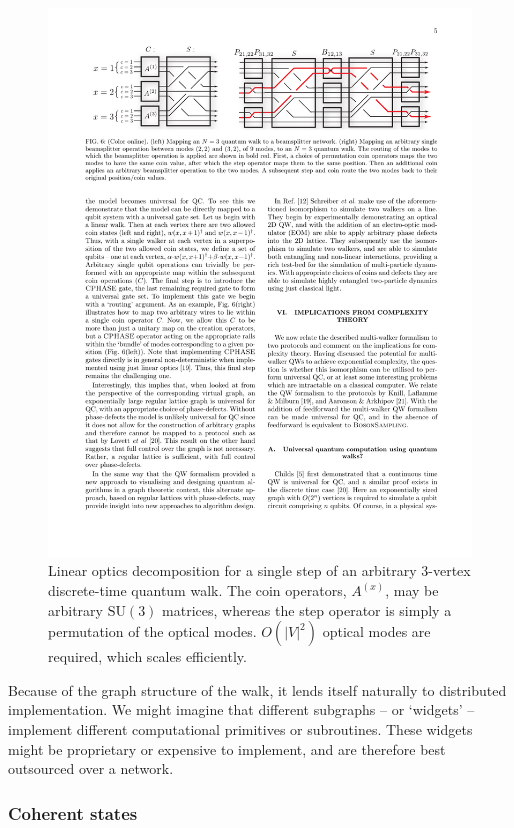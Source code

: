 \documentclass[aps,rmp,twocolumn,amsmath,amssymb,nofootinbib,superscriptaddress,longbibliography,floatfix,table-of-contents,eqsecnum]{revtex4-1}
\begin{document}
\begin{figure}[!htb]
\includegraphics[width=\columnwidth]{QW_LO_representation}
\caption{Linear optics decomposition for a single step of an arbitrary 3-vertex discrete-time quantum walk. The coin operators, $A^{(x)}$, may be arbitrary $\text{SU}(3)$ matrices, whereas the step operator is simply a permutation of the optical modes. $O(|V|^2)$ optical modes are required, which scales efficiently.} \label{fig:QW_LO_representation}
\end{figure}

Because of the graph structure of the walk, it lends itself naturally to distributed implementation. We might imagine that different subgraphs -- or `widgets' \cite{bib:Lovett10, bib:Childs09} -- implement different computational primitives or subroutines. These widgets might be proprietary or expensive to implement, and are therefore best outsourced over a network.

%
%

\subsubsection{Coherent states} \label{sec:coherent_state_QC} 
\end{document}

